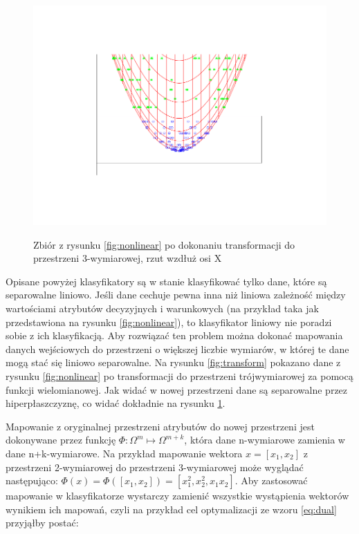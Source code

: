 \begin{figure}[h]
\centering
\includegraphics[scale=0.8]{figures/functions/2-transform-side}
\label{fig:transform-side}
\caption{Zbiór z rysunku \ref{fig:nonlinear} po dokonaniu transformacji do przestrzeni 3-wymiarowej, rzut wzdłuż osi X}
\end{figure}


Opisane powyżej klasyfikatory są w stanie klasyfikować tylko dane, które są separowalne liniowo. Jeśli dane cechuje pewna inna niż liniowa zależność między wartościami atrybutów decyzyjnych i warunkowych (na przykład taka jak przedstawiona na rysunku \ref{fig:nonlinear}), to klasyfikator liniowy nie poradzi sobie z ich klasyfikacją.
Aby rozwiązać ten problem można dokonać mapowania danych wejściowych do przestrzeni o większej liczbie wymiarów, w której te dane mogą stać się liniowo separowalne. Na rysunku \ref{fig:transform} pokazano dane z rysunku \ref{fig:nonlinear} po transformacji do przestrzeni trójwymiarowej za pomocą funkcji wielomianowej. Jak widać w nowej przestrzeni dane są separowalne przez hiperpłaszczyznę, co widać dokładnie na rysunku \ref{fig:transform-side}.

Mapowanie z oryginalnej przestrzeni atrybutów do nowej przestrzeni jest dokonywane przez funkcję $ \Phi: \Omega^m \mapsto \Omega^{m+k} $, która dane n-wymiarowe zamienia w dane n+k-wymiarowe. Na przykład mapowanie wektora $x = \left[ x_1, x_2 \right] $ z przestrzeni 2-wymiarowej do przestrzeni 3-wymiarowej może wyglądać następująco:
 $ \Phi(x) = \Phi(\left[x_1, x_2 \right]) = \left[ x_1^2, x_2^2, x_1 x_2 \right] $. Aby zastosować mapowanie w klasyfikatorze wystarczy zamienić wszystkie wystąpienia wektorów wynikiem ich mapowań, czyli na przykład cel optymalizacji ze wzoru \ref{eq:dual} przyjąłby postać:

